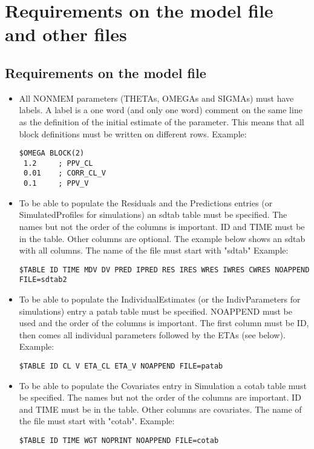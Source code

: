 \section{Requirements on the model file and other files}

\subsection{Requirements on the model file}
\begin{itemize}
    \item All NONMEM parameters (THETAs, OMEGAs and SIGMAs) must have labels. A label is a one word (and only one word) comment on the same line as the definition of the initial estimate of the parameter. This means that all block definitions must be written on different rows. Example:
        \begin{verbatim}
$OMEGA BLOCK(2)
 1.2     ; PPV_CL
 0.01    ; CORR_CL_V
 0.1     ; PPV_V
        \end{verbatim}
    \item To be able to populate the Residuals and the Predictions entries (or SimulatedProfiles for simulations) an sdtab table must be specified. The names but not the order of the columns is important. ID and TIME must be in the table. Other columns are optional. The example below shows an sdtab with all columns. The name of the file must start with "sdtab" Example:
        \begin{verbatim}
$TABLE ID TIME MDV DV PRED IPRED RES IRES WRES IWRES CWRES NOAPPEND FILE=sdtab2
        \end{verbatim}
    \item To be able to populate the IndividualEstimates (or the IndivParameters for simulations) entry a patab table must be specified. NOAPPEND must be used and the order of the columns is important. The first column must be ID, then comes all individual parameters followed by the ETAs (see below). Example:
        \begin{verbatim}
$TABLE ID CL V ETA_CL ETA_V NOAPPEND FILE=patab
        \end{verbatim}
    \item To be able to populate the Covariates entry in Simulation a cotab table must be specified. The names but not the order of the columns are important. ID and TIME must be in the table. Other columns are covariates. The name of the file must start with "cotab". Example:
        \begin{verbatim}
$TABLE ID TIME WGT NOPRINT NOAPPEND FILE=cotab

\end{verbatim}
\end{itemize}
